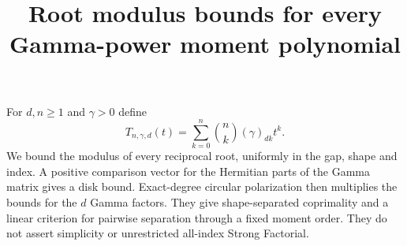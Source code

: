 \documentclass[11pt]{article}
\begin{document}
\setlength{\emergencystretch}{1em}
\title{Root modulus bounds for every Gamma-power moment polynomial}
\author{}\date{}\maketitle
For $d,n\ge1$ and $\gamma>0$ define
\[
 T_{n,\gamma,d}(t)=\sum_{k=0}^n\binom nk(\gamma)_{dk}t^k.
\]
We bound the modulus of every reciprocal root, uniformly in the gap,
shape and index.  A positive comparison vector for the Hermitian
parts of the Gamma matrix gives a disk bound.  Exact-degree circular
polarization then multiplies the bounds for the $d$ Gamma factors.
They give shape-separated coprimality and a linear criterion for
pairwise separation through a fixed moment order. They do not assert
simplicity or unrestricted all-index Strong Factorial.
\end{document}
